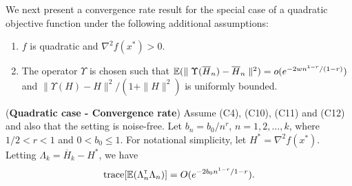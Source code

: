 
We next present a convergence rate result for the special case of a quadratic objective function under the following additional assumptions:
\begin{enumerate}[label=(\textbf{C\arabic*}),resume]
\item  $f$ is quadratic and $\nabla^2 f(x^*) > 0$. 
\item The operator $\Upsilon$ is chosen such that $\mathbb{E}(\parallel \Upsilon(\overline H_n) - \overline H_n\parallel^2) = o(e^{-2wn^{1-r}/(1-r)})$ and $\parallel \Upsilon(H) - H \parallel^2 / (1+\parallel H \parallel^2)$ is uniformly bounded.
\end{enumerate}
\begin{theorem}(\textbf{Quadratic case - Convergence rate})
\label{thm:quad-bound}
Assume (C4), (C10), (C11) and (C12) and also that the setting is noise-free. 
Let $b_n = b_0/n^r$, $n=1,2,\ldots,k$, where $1/2 < r < 1$ and $0 < b_0 \leq 1$. For notational simplicity, let $H^*=\nabla^2 f(x^*)$. Letting $\Lambda_k = \overline H_k - H^*$, we have 
\begin{align}
\text{trace}[\E (\Lambda_n \tr \Lambda_n)] = O(e^{-2b_0n^{1-r} / {1-r}}).
\label{eq:quad-bigo}
\end{align}
\end{theorem}
